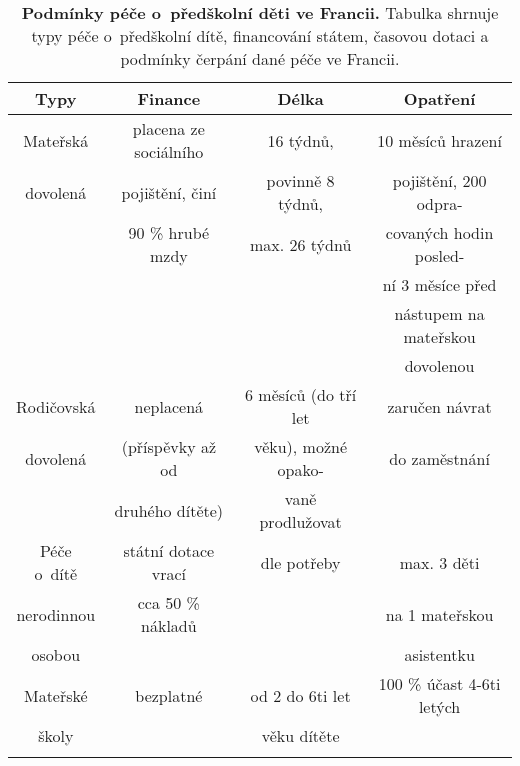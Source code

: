 		\begin{spacing}{1.0}
		\begin{table}[ht]
			\center
			\small
			\begin{center}
			\begin{tabular}{|c|c|c|c|}
				\hline
				\rowcolor{grey}		
				\textbf{Typy}	&	\textbf{Finance} & 	\textbf{Délka} 	&	\textbf{Opatření} 	\\
				\hline
				\hline
				\rowcolor{grey!10}
				Mateřská	&  placena ze sociálního &  16 týdnů, 		 & 10 měsíců hrazení 		\\ \rowcolor{grey!10}
				dovolená 	& 	 pojištění, činí  	 & 	povinně 8 týdnů, & pojištění, 200 odpra- 	\\ \rowcolor{grey!10}
				 			& 	90 \% hrubé mzdy 	 &  max. 26 týdnů 	 & covaných hodin posled- 	\\ \rowcolor{grey!10}
				 			&						 & 					 & ní 3 měsíce před 		\\ \rowcolor{grey!10}
				 			&						 &					 & nástupem na mateřskou 	\\ \rowcolor{grey!10}
				 			&						 & 					 & dovolenou 				\\ \rowcolor{grey!10}
				\hline
				Rodičovská	& neplacená & 6 měsíců (do tří let 		& 	zaručen návrat 	\\ \rowcolor{grey!10}
				dovolená & (příspěvky až od & věku), možné opako-  	&  do zaměstnání	\\ \rowcolor{grey!10}
						 & druhého dítěte)  & vaně prodlužovat						&	\\ \rowcolor{grey!10}
				 \hline
				Péče o~dítě	&	státní dotace vrací	&	dle potřeby	& max. 3 děti \\ \rowcolor{grey!10}
				nerodinnou 	&	cca 50 \% nákladů 	&	& na 1 mateřskou 	\\ \rowcolor{grey!10}
				osobou 		& 						&	& asistentku		\\ \rowcolor{grey!10}
				\hline
				Mateřské 	&	bezplatné	& od 2 do 6ti let	& 100 \% účast 4-6ti letých \\ \rowcolor{grey!10}
				školy 		& 	 			& věku dítěte	& 						\\ \rowcolor{grey!10}
				\hline
			\end{tabular}
			\end{center}
			\label{tab:peceFR}
			\caption{
				\textbf{Podmínky péče o~předškolní děti ve Francii.}
				Tabulka shrnuje typy péče o~předškolní dítě, financování státem, časovou dotaci a podmínky čerpání dané péče ve Francii.
							}
		\end{table}
		\end{spacing}

